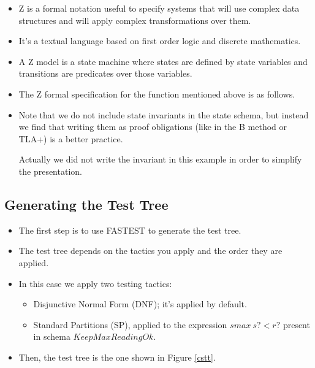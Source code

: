 \begin{itemize}

\item Z is a formal notation useful to specify systems that will use complex data structures and will apply complex transformations over them.

\item It's a textual language based on first order logic and discrete mathematics.

\item A Z model is a state machine where states are defined by state variables and transitions are predicates over those variables.

\item The Z formal specification for the function mentioned above is as follows.

\item Note that we do not include state invariants in the state schema, but instead we find that writing them as proof obligations (like in the B method or TLA+) is a better practice. 

Actually we did not write the invariant in this example in order to simplify the presentation.
\end{itemize}

\begin{multicols}{2}

\end{multicols}

\subsection{Generating the Test Tree}

\begin{itemize}

\item The first step is to use FASTEST to generate the test tree.

\item The test tree depends on the tactics you apply and the order they are applied.

\item In this case we apply two testing tactics:

\begin{itemize}

\item Disjunctive Normal Form (DNF); it's applied by default.

\item Standard Partitions (SP), applied to the expression $smax~s? < r?$ present in schema $KeepMaxReadingOk$.

\end{itemize}

\item Then, the test tree is the one shown in Figure \ref{cstt}.

\end{itemize}

